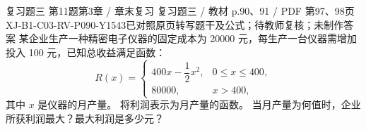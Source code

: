 \par\noindent\begin{minipage}{\linewidth}
\begin{bankitem}{复习题三 第11题}{第3章 / 章末复习 复习题三 / 教材 p.90、91 / PDF 第97、98页}{XJ-B1-C03-RV-P090-Y1543}{已对照原页转写题干及公式；待教师复核；未制作答案}
某企业生产一种精密电子仪器的固定成本为 20000 元，每生产一台仪器需增加投入 100 元，已知总收益满足函数：
\[R(x)=\begin{cases}400x-\dfrac12x^2,&0\le x\le400,\\80000,&x>400,\end{cases}\]
其中 $x$ 是仪器的月产量。
将利润表示为月产量的函数。
当月产量为何值时，企业所获利润最大？最大利润是多少元？
\end{bankitem}
\end{minipage}\par\medskip
